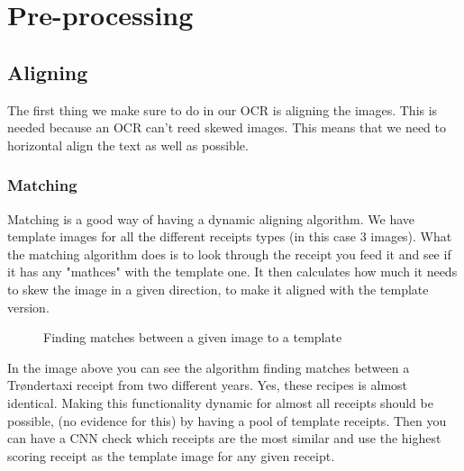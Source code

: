 \section{Pre-processing}\label{pre-processing}

\subsection{Aligning}\label{aligning}

The first thing we make sure to do in our OCR is aligning the images.
This is needed because an OCR can't reed skewed images.
This means that we need to horizontal align the text as well as possible.

\subsubsection[aligning]{Matching}

Matching is a good way of having a dynamic aligning algorithm.
We have template images for all the different receipts types (in this case 3 images).
What the matching algorithm does is to look through the receipt you feed it and see if it has any "mathces" with the template one.
It then calculates how much it needs to skew the image in a given direction, to make it aligned with the template version.

\begin{figure}[h]
    \caption{Finding matches between a given image to a template}
    \label{fig:figure4.2}
\end{figure}

In the image above you can see the algorithm finding matches between a Trøndertaxi receipt from two different years.
Yes, these recipes is almost identical.
Making this functionality dynamic for almost all receipts should be possible, (no evidence for this) by having a pool of template receipts.
Then you can have a CNN check which receipts are the most similar and use the highest scoring receipt as the template image for any given receipt.

